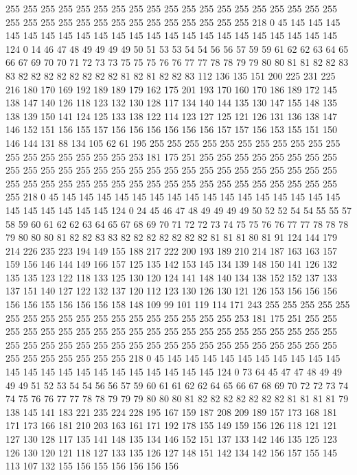 255 255 255 255 255 255 255 255 255 255 255 255 255 255 255 255 255 255 255 255
255 255 255 255 255 255 255 255 255 255 255 255 255 218 0 45 145 145 145 145
145 145 145 145 145 145 145 145 145 145 145 145 145 145 145 145 145 145 124 0
14 46 47 48 49 49 49 49 50 51 53 53 54 54 56 56 57 59 59 61
62 62 63 64 65 66 67 69 70 70 71 72 73 73 75 75 75 76 76 77
77 78 78 79 79 80 80 81 81 82 82 83 83 82 82 82 82 82 82 82
82 81 82 81 82 82 83 112 136 135 151 200 225 231 225 216 180 170 169 192
189 189 179 162 175 201 193 170 160 170 186 189 172 145 138 147 140 126 118 123
132 130 128 117 134 140 144 135 130 147 155 148 135 138 139 150 141 124 125 133
138 122 114 123 127 125 121 126 131 136 138 147 146 152 151 156 155 157 156 156
156 156 156 156 157 157 156 153 155 151 150 146 144 131 88 134 105 62 61 195
255 255 255 255 255 255 255 255 255 255 255 255 255 255 255 255 255 255 253 181
175 251 255 255 255 255 255 255 255 255 255 255 255 255 255 255 255 255 255 255
255 255 255 255 255 255 255 255 255 255 255 255 255 255 255 255 255 255 255 255
255 255 255 255 255 255 255 255 255 218 0 45 145 145 145 145 145 145 145 145
145 145 145 145 145 145 145 145 145 145 145 145 145 145 124 0 24 45 46 47
48 49 49 49 49 50 52 52 54 54 55 55 57 58 59 60 61 62 62 63
64 65 67 68 69 70 71 72 72 73 74 75 75 76 76 77 77 78 78 78
79 80 80 80 81 82 82 83 83 82 82 82 82 82 82 82 81 81 81 80
81 91 124 144 179 214 226 235 223 194 149 155 188 217 222 200 193 189 210 214
187 163 163 157 159 156 146 144 149 166 157 125 135 142 153 145 134 139 148 150
141 126 132 135 135 123 122 118 133 125 130 120 124 141 148 140 134 138 152 152
137 133 137 151 140 127 122 132 137 120 112 123 130 126 130 121 126 153 156 156
156 156 156 155 156 156 156 158 148 109 99 101 119 114 171 243 255 255 255 255
255 255 255 255 255 255 255 255 255 255 255 255 255 255 253 181 175 251 255 255
255 255 255 255 255 255 255 255 255 255 255 255 255 255 255 255 255 255 255 255
255 255 255 255 255 255 255 255 255 255 255 255 255 255 255 255 255 255 255 255
255 255 255 255 255 218 0 45 145 145 145 145 145 145 145 145 145 145 145 145
145 145 145 145 145 145 145 145 145 145 124 0 73 64 45 47 47 48 49 49
49 49 51 52 53 54 54 56 56 57 59 60 61 61 62 62 64 65 66 67
68 69 70 72 72 73 74 74 75 76 76 77 77 78 78 79 79 79 80 80
80 81 82 82 82 82 82 82 82 81 81 81 81 79 138 145 141 183 221 235
224 228 195 167 159 187 208 209 189 157 173 168 181 171 173 166 181 210 203 163
161 171 192 178 155 149 159 156 126 118 121 121 127 130 128 117 135 141 148 135
134 146 152 151 137 133 142 146 135 125 123 126 130 120 121 118 127 133 135 126
127 148 151 142 134 142 156 157 155 145 113 107 132 155 156 155 156 156 156 156
